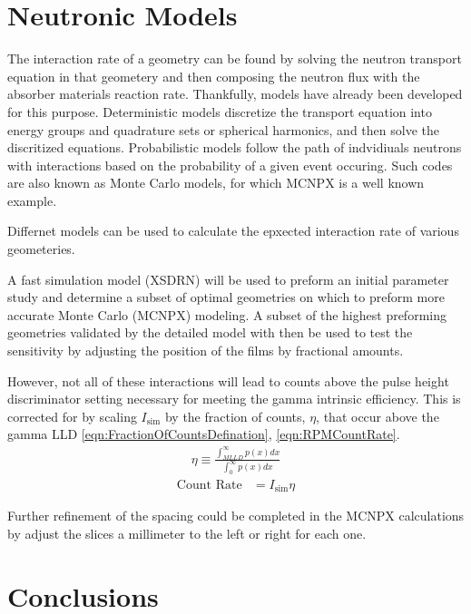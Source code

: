 \section{Neutronic Models}
The interaction rate of a geometry can be found by solving the neutron transport equation in that geometery and then composing the neutron flux with the absorber materials reaction rate.
Thankfully, models have already been developed for this purpose.
Deterministic models discretize the transport equation into energy groups and quadrature sets or spherical harmonics, and then solve the discritized equations.
Probabilistic models follow the path of indvidiuals neutrons with interactions based on the probability of a given event occuring.
Such codes are also known as Monte Carlo models, for which MCNPX is a well known example.

Differnet models can be used to calculate the epxected interaction rate of various geometeries.

A fast simulation model (XSDRN) will be used to preform an initial parameter study and determine a subset of optimal geometries on which to preform more accurate Monte Carlo (MCNPX) modeling. 
A subset of the highest preforming geometries validated by the detailed model with then be used to test the sensitivity by adjusting the position of the films by fractional amounts.


However, not all of these interactions will lead to counts above the pulse height discriminator setting necessary for meeting the gamma intrinsic efficiency.
This is corrected for by scaling $I_{\text{sim}}$ by the fraction of counts, $\eta$, that occur above the gamma LLD \eqref{eqn:FractionOfCountsDefination}, \eqref{eqn:RPMCountRate}.
\begin{align}
  \label{eqn:FractionOfCountsDefination}
  \eta \equiv \frac{\int_{MLLD}^\infty p(x)dx}{\int_0^\infty p(x)dx}
\end{align}
\begin{align}
 \label{eqn:RPMCountRate}
 \text{Count Rate} &= I_{\text{sim}} \eta
\end{align}




Further refinement of the spacing could be completed in the MCNPX calculations by adjust the slices a millimeter to the left or right for each one.

\section{Conclusions}

